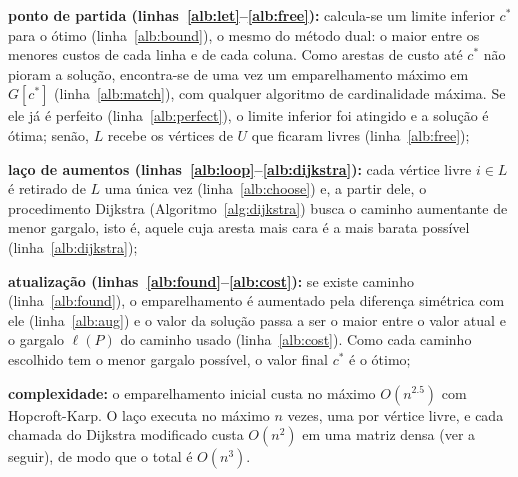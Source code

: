 \begin{alineas}
    \item \textbf{ponto de partida (linhas~\ref{alb:let}--\ref{alb:free}):} calcula-se um limite inferior $c^*$ para o ótimo (linha~\ref{alb:bound}), o mesmo do método dual: o maior entre os menores custos de cada linha e de cada coluna. Como arestas de custo até $c^*$ não pioram a solução, encontra-se de uma vez um emparelhamento máximo em $G[c^*]$ (linha~\ref{alb:match}), com qualquer algoritmo de cardinalidade máxima. Se ele já é perfeito (linha~\ref{alb:perfect}), o limite inferior foi atingido e a solução é ótima; senão, $L$ recebe os vértices de $U$ que ficaram livres (linha~\ref{alb:free});
    \item \textbf{laço de aumentos (linhas~\ref{alb:loop}--\ref{alb:dijkstra}):} cada vértice livre $i \in L$ é retirado de $L$ uma única vez (linha~\ref{alb:choose}) e, a partir dele, o procedimento Dijkstra (Algoritmo~\ref{alg:dijkstra}) busca o caminho aumentante de menor gargalo, isto é, aquele cuja aresta mais cara é a mais barata possível (linha~\ref{alb:dijkstra});
    \item \textbf{atualização (linhas~\ref{alb:found}--\ref{alb:cost}):} se existe caminho (linha~\ref{alb:found}), o emparelhamento é aumentado pela diferença simétrica com ele (linha~\ref{alb:aug}) e o valor da solução passa a ser o maior entre o valor atual e o gargalo $\ell(P)$ do caminho usado (linha~\ref{alb:cost}). Como cada caminho escolhido tem o menor gargalo possível, o valor final $c^*$ é o ótimo;
    \item \textbf{complexidade:} o emparelhamento inicial custa no máximo $O(n^{2.5})$ com Hopcroft-Karp. O laço executa no máximo $n$ vezes, uma por vértice livre, e cada chamada do Dijkstra modificado custa $O(n^2)$ em uma matriz densa (ver a seguir), de modo que o total é $O(n^3)$.
\end{alineas}


